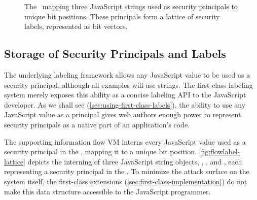 \begin{figure}[t]
{
}
 \caption{The \FlowLabelRegistry\ mapping three JavaScript strings used as security principals to unique bit positions.
   These principals form a lattice of security labels, represented as bit vectors.}
 \label{fig:flowlabel-lattice}
\end{figure}

\subsection{Storage of Security Principals and Labels}
\label{sec:label-storage}

The underlying labeling framework allows any JavaScript value to be used as a security principal, although all examples will use strings.
The first-class labeling system merely exposes this ability as a concise labeling API to the JavaScript developer.
As we shall see (\autoref{sec:using-first-class-labels}), the ability to use any JavaScript value as a principal gives web authors enough power to represent security principals as a native part of an application's code.

The supporting information flow VM interns every JavaScript value used as a security principal in the \FlowLabelRegistry, mapping it to a unique bit position.
\autoref{fig:flowlabel-lattice} depicts the interning of three JavaScript string objects, , , and , each representing a security principal in the \FlowLabelRegistry.
To minimize the attack surface on the system itself, the first-class extensions (\autoref{sec:first-class-implementation}) do not make this data structure accessible to the JavaScript programmer.

